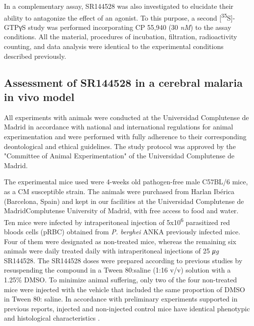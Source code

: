 \documentclass[empirical, authordate]{jote-new-article}
\begin{document}
In a complementary assay, SR144528 was also investigated to elucidate their ability to antagonize the effect of an agonist. To this purpose, a second [\textsuperscript{35}S]-GTPγS study was performed incorporating CP 55,940 (30 \emph{nM}) to the assay conditions. All the material, procedures of incubation, filtration, radioactivity counting, and data analysis were identical to the experimental conditions described previously.

\subsection{Assessment of SR144528 in a cerebral malaria in vivo model}

All experiments with animals were conducted at the Universidad Complutense de Madrid in accordance with national and international regulations for animal experimentation and were performed with fully adherence to their corresponding deontological and ethical guidelines. The study protocol was approved by the "Committee of Animal Experimentation" of the Universidad Complutense de Madrid.


The experimental mice used were 4-weeks old pathogen-free male C57BL/6 mice, as a CM susceptible strain. The animals were purchased from Harlan Ibérica (Barcelona, Spain) and kept in our facilities at the Universidad Complutense de MadridComplutense University of Madrid, with free access to food and water. Ten mice were infected by intraperitoneal injection of 5x10\textsuperscript{6} parasitized red bloods cells (pRBC) obtained from \emph{P. berghei}\emph{\textbf{ }}ANKA previously infected mice. Four of them were designated as non-treated mice, whereas the remaining six animals were daily treated daily with intraperitoneal injections of 25 \emph{μg} SR144528. The SR144528 doses were prepared according to previous studies \parencite{Alferink2016} by resuspending the compound in a Tween 80:saline (1:16 v/v) solution with a 1.25\% DMSO. To minimize animal suffering, only two of the four non-treated mice were injected with the vehicle that included the same proportion of DMSO in Tween 80: saline. In accordance with preliminary experiments supported in previous reports, injected and non-injected control mice have identical phenotypic and histological characteristics \parencite{Marín-García2009}.
\end{document}
